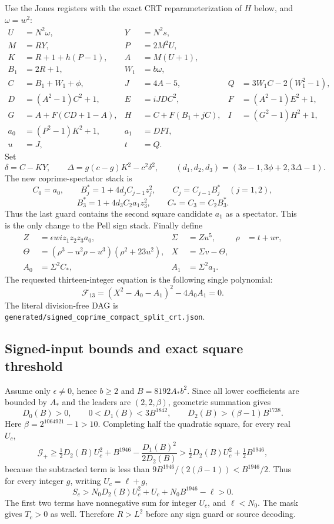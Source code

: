 Use the Jones registers with the exact CRT reparameterization of $H$ below, and $\omega=w^2$:
\begin{align*}
 U&=N^2\omega,&Y&=N^2s,\\
 M&=RY,&P&=2M^2U,\\
 K&=R+1+h(P-1),&A&=M(U+1),\\
 B_1&=2R+1,&W_1&=b\omega,\\
 C&=B_1+W_1+\phi,&J&=4A-5,&
 Q&=3W_1C-2(W_1^2-1),\\
 D&=(A^2-1)C^2+1,&E&=iJDC^2,&F&=(A^2-1)E^2+1,\\
 G&=A+F(CD+1-A),&H&=C+F(B_1+jC),&I&=(G^2-1)H^2+1,\\
 a_0&=(P^2-1)K^2+1,&a_1&=DFI,\\
 u&=J,&t&=Q.
\end{align*}
Set
\[
 \delta=C-KY,\qquad \Delta=g(c-g)K^2-c^2\delta^2,
 \qquad (d_1,d_2,d_3)=(3s-1,3\phi+2,3\Delta-1).
\]
The new coprime-spectator stack is
\[
 C_0=a_0,\qquad B_j^*=1+4d_jC_{j-1}z_j^2,\qquad
 C_j=C_{j-1}B_j^*\quad(j=1,2),
\]
\[
 B_3^*=1+4d_3C_2a_1z_3^2,\qquad C_*=C_3=C_2B_3^*.
\]
Thus the last guard contains the second square candidate $a_1$ as a
spectator. This is the only change to the Pell sign stack.
Finally define
\begin{align*}
 Z&=\epsilon wi z_1z_2z_3a_0,&\Sigma&=Zu^5,&\rho&=t+ur,\\
 \Theta&=(\rho^3-u^2\rho-u^3)(\rho^2+23u^2),&
 X&=\Sigma v-\Theta,\\
 A_0&=\Sigma^2C_*,&A_1&=\Sigma^2a_1.
\end{align*}
The requested thirteen-integer equation is the following single polynomial:
\begin{equation}\label{eq:jones-seeded}
 \boxed{\mathcal F_{13}=(X^2-A_0-A_1)^2-4A_0A_1=0.}
\end{equation}
The literal division-free DAG is \texttt{generated/signed\_coprime\_compact\_split\_crt.json}.

\subsection{Signed-input bounds and exact square threshold}
Assume only $\epsilon\ne0$, hence $b\ge2$ and $B=8192A_*b^2$. Since all lower coefficients are bounded by $A_*$ and the leaders are $(2,2,\beta)$, geometric summation gives
\[
D_0(B)>0,\qquad 0<D_1(B)<3B^{1842},\qquad D_2(B)>(\beta-1)B^{1738}.
\]
Here $\beta=2^{1064921}-1>10$. Completing half the quadratic square, for every real $U_c$,
\[
\mathcal G_+\ge\tfrac12D_2(B)U_c^2+B^{1946}-\frac{D_1(B)^2}{2D_2(B)}
>\tfrac12D_2(B)U_c^2+\tfrac12B^{1946},
\]
because the subtracted term is less than $9B^{1946}/(2(\beta-1))<B^{1946}/2$.
Thus for every integer $g$, writing $U_c=\ell+g$,
\[
S_c>N_0D_2(B)U_c^2+U_c+N_0B^{1946}-\ell>0.
\]
The first two terms have nonnegative sum for integer $U_c$, and $\ell<N_0$. The mask gives $T_c>0$ as well. Therefore $R>L^2$ before any sign guard or source decoding.

